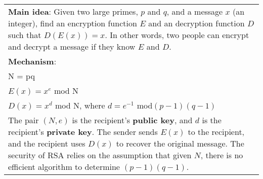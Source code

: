 {\tabulinesep=1mm
\begin{tabu}{|p{16cm} |}
\hline
\textbf{Main idea}: Given two large primes, $p$ and $q$, and a message $x$ (an integer), find an encryption function $E$ and an decryption function $D$ such that $D(E(x)) = x$. In other words, two people can encrypt and decrypt a message if they know $E$ and $D$. \\
\textbf{Mechanism}:\\ 
N = pq \\ 
$E(x) = x^e$ mod N\\ 
$D(x) = x^d$ mod N, where $d = e^{-1}$ mod$(p-1)(q-1)$ \\
The pair $(N, e)$ is the recipient's \textbf{public key}, and $d$ is the recipient's \textbf{private key}.
The sender sends $E(x)$ to the recipient, and the recipient uses $D(x)$ to recover the original message. The security of RSA relies on the assumption that given $N$, there is no efficient algorithm to determine $(p-1)(q-1)$. \\
\hline
\end{tabu}
}